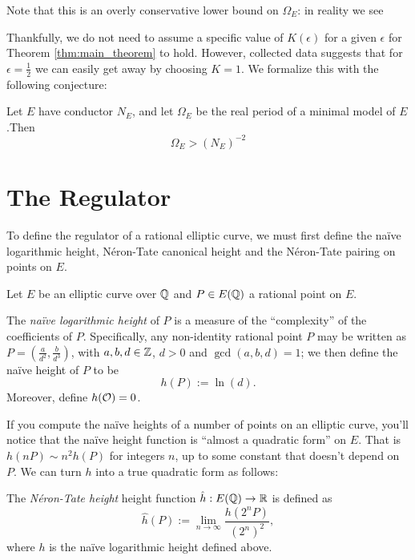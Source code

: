 Note that this is an overly conservative lower bound on $\Omega_E$: in reality we see

Thankfully, we do not need to assume a specific value of $K(\epsilon)$ for a given $\epsilon$ for Theorem \ref{thm:main_theorem} to hold. However, collected data suggests that for $\epsilon=\frac{1}{2}$ we can easily get away by choosing $K = 1$. We formalize this with the following conjecture:
\begin{conjecture}
Let $E$ have conductor $N_E$, and let $\Omega_E$ be the real period of a minimal model of $E$.Then 
\begin{equation}
\Omega_E > (N_E)^{-2}
\end{equation}
\end{conjecture}

\newpage
\section{The Regulator}

To define the regulator of a rational elliptic curve, we must first define the na\"ive logarithmic height, N\'eron-Tate canonical height and the N\'eron-Tate pairing on points on $E$.

Let $E$ be an elliptic curve over $\mathbb{Q}$ and $P \in E(\mathbb{Q})$ a rational point on $E$. 

\begin{definition}
The {\it na\"ive logarithmic height} of $P$ is a measure of the ``complexity'' of the coefficients of $P$. Specifically, any non-identity rational point $P$ may be written as $P = (\frac{a}{d^2},\frac{b}{d^3})$, with $a,b,d \in \mathbb{Z}$, $d>0$ and $\gcd(a,b,d) = 1$; we then define the na\"ive height of $P$ to be
\begin{equation}
	h(P) := \ln(d).
\end{equation}
Moreover, define $h(\mathcal{O}) = 0$.
\end{definition}
If you compute the na\"ive heights of a number of points on an elliptic curve, you'll notice that the na\"ive height function is ``almost a quadratic form'' on $E$. That is $h(nP) \sim n^2 h(P)$ for integers $n$, up to some constant that doesn't depend on $P$. We can turn $h$ into a true quadratic form as follows:

\begin{definition}
The {\it N\'eron-Tate height} height function $\hat{h}: E(\mathbb{Q}) \to \mathbb{R}$ is defined as
\begin{equation}
	\hat{h}(P) := \lim_{n \to \infty} \frac{h(2^n P)}{(2^n)^2},
\end{equation}
where $h$ is the na\"ive logarithmic height defined above.
\end{definition}

